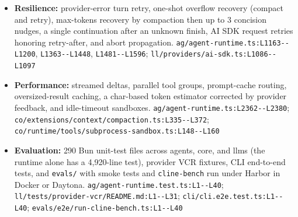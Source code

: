 \begin{itemize}
\item \textbf{Resilience:} provider-error turn retry, one-shot overflow recovery (compact and retry), max-tokens recovery by compaction then up to 3 concision nudges, a single continuation after an unknown finish, AI SDK request retries honoring retry-after, and abort propagation. \texttt{ag/\allowbreak{}agent-\allowbreak{}runtime.\allowbreak{}ts:\allowbreak{}L1163-\allowbreak{}-\allowbreak{}L1200}, \texttt{L1363-\allowbreak{}-\allowbreak{}L1448}, \texttt{L1481-\allowbreak{}-\allowbreak{}L1596}; \texttt{ll/\allowbreak{}providers/\allowbreak{}ai-\allowbreak{}sdk.\allowbreak{}ts:\allowbreak{}L1086-\allowbreak{}-\allowbreak{}L1097}
\item \textbf{Performance:} streamed deltas, parallel tool groups, prompt-cache routing, oversized-result caching, a char-based token estimator corrected by provider feedback, and idle-timeout sandboxes. \texttt{ag/\allowbreak{}agent-\allowbreak{}runtime.\allowbreak{}ts:\allowbreak{}L2362-\allowbreak{}-\allowbreak{}L2380}; \texttt{co/\allowbreak{}extensions/\allowbreak{}context/\allowbreak{}compaction.\allowbreak{}ts:\allowbreak{}L335-\allowbreak{}-\allowbreak{}L372}; \texttt{co/\allowbreak{}runtime/\allowbreak{}tools/\allowbreak{}subprocess-\allowbreak{}sandbox.\allowbreak{}ts:\allowbreak{}L148-\allowbreak{}-\allowbreak{}L160}
\item \textbf{Evaluation:} 290 Bun unit-test files across agents, core, and llms (the runtime alone has a 4,920-line test), provider VCR fixtures, CLI end-to-end tests, and \texttt{evals/\allowbreak{}} with smoke tests and \texttt{cline-\allowbreak{}bench} run under Harbor in Docker or Daytona. \texttt{ag/\allowbreak{}agent-\allowbreak{}runtime.\allowbreak{}test.\allowbreak{}ts:\allowbreak{}L1-\allowbreak{}-\allowbreak{}L40}; \texttt{ll/\allowbreak{}tests/\allowbreak{}provider-\allowbreak{}vcr/\allowbreak{}README.\allowbreak{}md:\allowbreak{}L1-\allowbreak{}-\allowbreak{}L31}; \texttt{cli/\allowbreak{}cli.\allowbreak{}e2e.\allowbreak{}test.\allowbreak{}ts:\allowbreak{}L1-\allowbreak{}-\allowbreak{}L40}; \texttt{evals/\allowbreak{}e2e/\allowbreak{}run-\allowbreak{}cline-\allowbreak{}bench.\allowbreak{}ts:\allowbreak{}L1-\allowbreak{}-\allowbreak{}L40}
\end{itemize}

